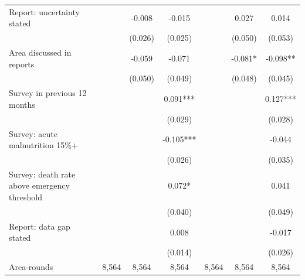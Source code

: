 \begin{tabular}{lcccccc}
Report: uncertainty stated &  & -0.008 & -0.015 &  & 0.027 & 0.014 \\
 &  & (0.026) & (0.025) &  & (0.050) & (0.053) \\
Area discussed in reports &  & -0.059 & -0.071 &  & -0.081* & -0.098** \\
 &  & (0.050) & (0.049) &  & (0.048) & (0.045) \\
Survey in previous 12 months &  &  & 0.091*** &  &  & 0.127*** \\
 &  &  & (0.029) &  &  & (0.028) \\
Survey: acute malnutrition 15\%+ &  &  & -0.105*** &  &  & -0.044 \\
 &  &  & (0.026) &  &  & (0.035) \\
Survey: death rate above emergency threshold &  &  & 0.072* &  &  & 0.041 \\
 &  &  & (0.040) &  &  & (0.049) \\
Report: data gap stated &  &  & 0.008 &  &  & -0.017 \\
 &  &  & (0.014) &  &  & (0.026) \\
\midrule
Area-rounds & 8,564 & 8,564 & 8,564 & 8,564 & 8,564 & 8,564 \\
\bottomrule
\end{tabular}
